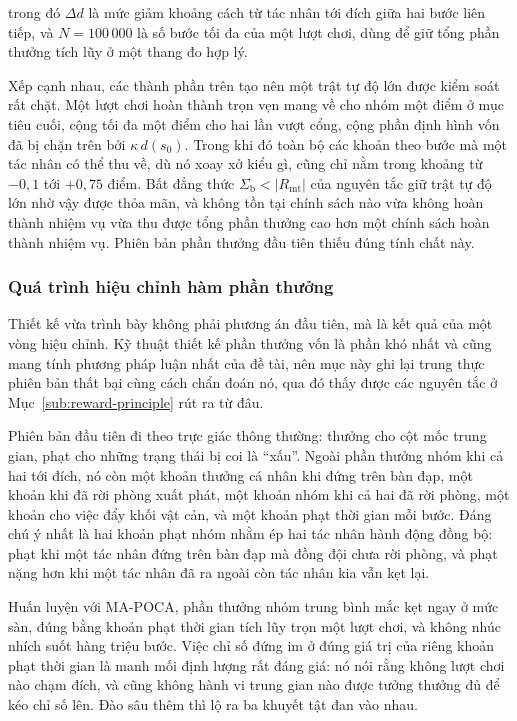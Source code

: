 \noindent trong đó $\Delta d$ là mức giảm khoảng cách từ tác nhân tới đích giữa hai bước
liên tiếp, và $N = 100\,000$ là số bước tối đa của một lượt chơi, dùng để giữ tổng phần
thưởng tích lũy ở một thang đo hợp lý.

\indent Xếp cạnh nhau, các thành phần trên tạo nên một trật tự độ lớn được kiểm soát rất
chặt. Một lượt chơi hoàn thành trọn vẹn mang về cho nhóm một điểm ở mục tiêu cuối, cộng
tối đa một điểm cho hai lần vượt cổng, cộng phần định hình vốn đã bị chặn trên bởi
$\kappa\,d(s_0)$. Trong khi đó toàn bộ các khoản theo bước mà một tác nhân có thể thu về,
dù nó xoay xở kiểu gì, cũng chỉ nằm trong khoảng từ $-0{,}1$ tới $+0{,}75$ điểm. Bất đẳng thức $\Sigma_{\mathrm{b}}
< |R_{\mathrm{mt}}|$ của nguyên tắc giữ trật tự độ lớn nhờ vậy được thỏa mãn, và không tồn
tại chính sách nào vừa không hoàn thành nhiệm vụ vừa thu được tổng phần thưởng cao hơn một
chính sách hoàn thành nhiệm vụ. Phiên bản phần thưởng đầu tiên thiếu đúng tính chất này.

\subsubsection{Quá trình hiệu chỉnh hàm phần thưởng}
\label{sub:coop-reward-process}
\indent Thiết kế vừa trình bày không phải phương án đầu tiên, mà là kết quả của một vòng
hiệu chỉnh. Kỹ thuật thiết kế phần thưởng vốn là phần khó nhất và cũng mang tính phương
pháp luận nhất của đề tài, nên mục này ghi lại trung thực phiên bản thất bại cùng cách chẩn
đoán nó, qua đó thấy được các nguyên tắc ở Mục~\ref{sub:reward-principle} rút ra từ
đâu.

\indent Phiên bản đầu tiên đi theo trực giác thông thường: thưởng cho cột mốc trung gian,
phạt cho những trạng thái bị coi là ``xấu''. Ngoài phần thưởng nhóm khi cả hai tới đích,
nó còn một khoản thưởng cá nhân khi đứng trên bàn đạp, một khoản khi đã rời phòng xuất
phát, một khoản nhóm khi cả hai đã rời phòng, một khoản cho việc đẩy khối vật cản, và một
khoản phạt thời gian mỗi bước. Đáng chú ý nhất là hai khoản phạt nhóm nhằm ép hai tác nhân
hành động đồng bộ: phạt khi một tác nhân đứng trên bàn đạp mà đồng đội chưa rời phòng, và
phạt nặng hơn khi một tác nhân đã ra ngoài còn tác nhân kia vẫn kẹt lại.

\indent Huấn luyện với MA-POCA, phần thưởng nhóm trung bình mắc kẹt ngay ở mức sàn, đúng bằng
khoản phạt thời gian tích lũy trọn một lượt chơi, và không nhúc nhích suốt hàng
triệu bước. Việc chỉ số đứng im ở đúng giá trị của riêng khoản phạt thời gian là manh mối
định lượng rất đáng giá: nó nói rằng không lượt chơi nào chạm đích, và cũng không hành vi
trung gian nào được tưởng thưởng đủ để kéo chỉ số lên. Đào sâu thêm thì lộ ra ba khuyết
tật đan vào nhau.

